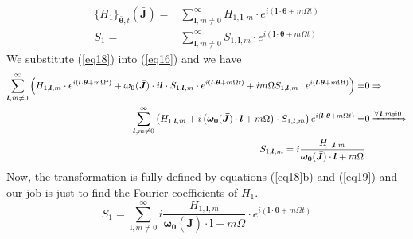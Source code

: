 \begin{subequations}\label{eq18}
		\begin{alignat}{2}	
		\{H_1\}_{\bm{\bar{\theta}},t}(\bm{\bar{J}}) =& \sum_{\bm{l},m\neq0}^\infty H_{1,\bm{l},m} \cdot e^{i(\bm{l}\cdot\bm{\theta}+m\Omega t)} \\ 
		S_1                           =& \sum_{\bm{l},m\neq0}^\infty S_{1,\bm{l},m} \cdot e^{i(\bm{l}\cdot\bm{\theta}+m\Omega t)} 
		\end{alignat}
\end{subequations}	
%
We substitute (\ref{eq18}) into (\ref{eq16}) and we have 
	\begin{align}\label{eq19} 
			\sum_{\bm{l},m\neq0}^\infty \left( H_{1,\bm{l},m} \cdot 
			e^{i(\bm{l}\cdot\bm{\theta}+m\Omega t)} + \bm{\omega_0}(\bm{\bar{J}})\cdot i\bm{l} \cdot S_{1,\bm{l},m} \cdot e^{i(\bm{l}\cdot\bm{\theta}+m\Omega t)} +
			im\Omega S_{1,\bm{l},m} \cdot e^{i(\bm{l}\cdot\bm{\theta}+m\Omega t)}\right) =& 0 \Rightarrow \nonumber \\ 
			\sum_{\bm{l},m\neq0}^\infty \left(  H_{1,\bm{l},m} + i\left(\bm{\omega_0}(\bm{\bar{J}})\cdot \bm{l}  + m\Omega\right)\cdot S_{1,\bm{l},m}  
					\right)e^{i(\bm{l}\cdot\bm{\theta}+m\Omega t)} =& 0  \xRightarrow{\forall\hspace{0.05cm}\bm{l},m\neq0} \nonumber \\
					S_{1,\bm{l},m} =  i\frac{H_{1,\bm{l},m}}{\bm{\omega_0}(\bm{\bar{J}})\cdot \bm{l} + m\Omega}&
	\end{align}
%
Now, the transformation is fully defined by equations (\ref{eq18}b) and (\ref{eq19}) and our job is just to find the Fourier coefficients of $H_1$.
	\begin{equation}
		S_1 = \sum_{\bm{l},m\neq0}^\infty i\frac{H_{1,\bm{l},m}}{\bm{\omega_0}(\bm{\bar{J}})\cdot \bm{l} + m\Omega} \cdot e^{i(\bm{l}\cdot\bm{\theta}+m\Omega t)} 
	\end{equation}


 	